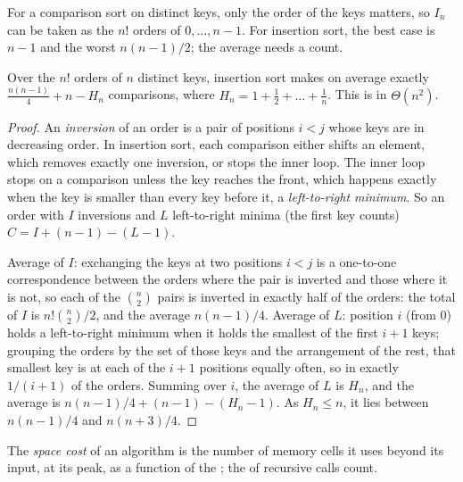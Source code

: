 For a comparison sort on distinct keys, only the order of the keys matters, so $I_n$ can be taken as the $n!$ orders of
$0, \dots, n - 1$. For insertion sort, the best case is $n - 1$ and the worst $n(n - 1)/2$; the average needs a count.

\begin{proposition}\label{prop:b1:asymptotic-analysis:insertion}
Over the $n!$ orders of $n$ distinct keys, insertion sort makes on average exactly $\frac{n(n - 1)}{4} + n - H_n$
comparisons, where $H_n = 1 + \frac12 + \dots + \frac1n$. This is in $\Theta(n^2)$.
\end{proposition}

\begin{proof}
An \emph{inversion} of an order is a pair of positions $i < j$ whose keys are in decreasing order. In insertion sort,
each comparison either shifts an element, which removes exactly one inversion, or stops the inner loop. The inner loop
stops on a comparison unless the key reaches the front, which happens exactly when the key is smaller than every key
before it, a \emph{left-to-right minimum}. So an order with $I$ inversions and $L$ left-to-right minima (the first
key counts)  $C = I + (n - 1) - (L - 1)$.

Average of $I$: exchanging the keys at two positions $i < j$ is a one-to-one correspondence between the orders where
the pair is inverted and those where it is not, so each of the $\binom{n}{2}$ pairs is inverted in exactly half of
the orders: the total of $I$ is $n! \binom{n}{2}/2$, and the average $n(n - 1)/4$. Average of $L$: position $i$ (from 0)
holds a left-to-right minimum when it holds the smallest of the first $i + 1$ keys; grouping the orders by the set of
those keys and the arrangement of the rest, that smallest key is at each of the $i + 1$ positions equally often, so in
exactly $1/(i + 1)$ of the orders. Summing over $i$, the average of $L$ is $H_n$, and the average  is $n(n - 1)/4 +
(n - 1) - (H_n - 1)$. As $H_n \leq n$, it lies between $n(n - 1)/4$ and $n(n + 3)/4$.
\end{proof}

\label{out:b1:asymptotic-analysis:inversions}

\begin{definition}\label{def:b1:asymptotic-analysis:space}
The \emph{space cost} of an algorithm is the number of memory cells it uses beyond its input, at its
peak, as a function of the ; the  of recursive calls count.
\end{definition}

